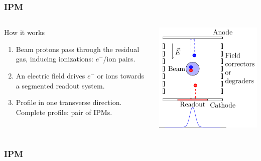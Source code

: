 \begin{frame}
  \frametitle{IPM}
  \begin{columns}
    \begin{column}{0.45\textwidth}
      \begin{block}{How it works}
        \begin{enumerate}
          \item Beam protons pass through the residual gas, inducing ionizations: $e^-$/ion pairs.
          \item An electric field drives $e^-$ or ions towards a segmented readout system.
          \item Profile in one transverse direction. Complete profile: pair of IPMs.
        \end{enumerate}      
      \end{block}
    \end{column}
    \begin{column}{0.45\textwidth}
      \includegraphics[width=\textwidth]{02_ESS/fig/fig000_IPM.pdf}
    \end{column}
  \end{columns}
\end{frame}

\begin{frame}
  \frametitle{IPM}

\end{frame}